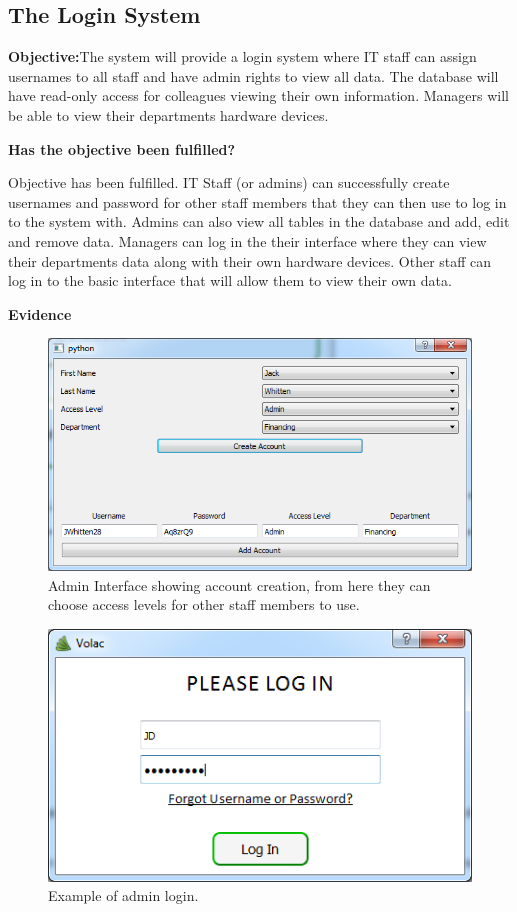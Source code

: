 \subsection{The Login System}

\textbf{Objective:}The system will provide a login system where IT staff can assign usernames to all staff and have admin rights to view all data. The database will have read-only access for colleagues viewing their own information. Managers will be able to view their departments hardware devices.

\textbf{Has the objective been fulfilled?}

Objective has been fulfilled. IT Staff (or admins) can successfully create usernames and password for other staff members that they can then use to log in to the system with. Admins can also view all tables in the database and add, edit and remove data. Managers can log in the their interface where they can view their departments data along with their own hardware devices. Other staff can log in to the basic interface that will allow them to view their own data.

\textbf{Evidence}

\begin{figure}[H]
    \includegraphics[width=\textwidth]{./Evaluation/Images/login1.png}
    \caption{Admin Interface showing account creation, from here they can choose access levels for other staff members to use.} 
\end{figure}

\begin{figure}[H]
    \includegraphics[width=\textwidth]{./Evaluation/Images/login2.png}
    \caption{Example of admin login.} 
\end{figure}

